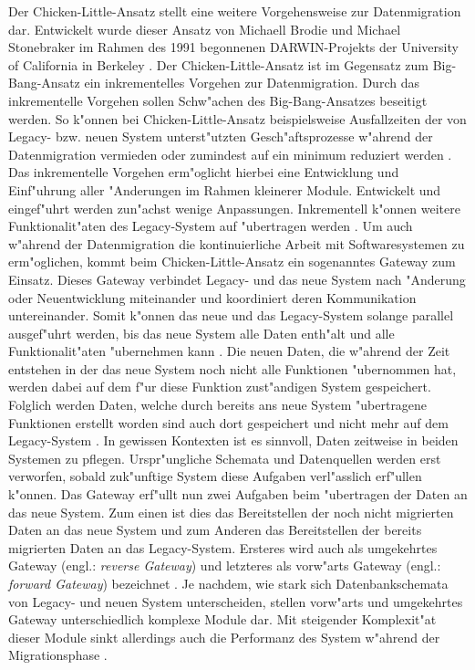 Der Chicken-Little-Ansatz stellt eine weitere Vorgehensweise zur Datenmigration dar. Entwickelt wurde dieser Ansatz von Michaell Brodie und Michael Stonebraker im Rahmen des 1991 begonnenen DARWIN-Projekts der University of California in Berkeley \citep{zoulafy-2002}. Der Chicken-Little-Ansatz ist im Gegensatz zum Big-Bang-Ansatz ein inkrementelles Vorgehen zur Datenmigration. Durch das inkrementelle Vorgehen sollen Schw"achen des Big-Bang-Ansatzes beseitigt werden. So k"onnen bei Chicken-Little-Ansatz beispielsweise Ausfallzeiten der von Legacy- bzw. neuen System unterst"utzten Gesch"aftsprozesse w"ahrend der Datenmigration vermieden oder zumindest auf ein minimum reduziert werden \citep{zoulafy-2002}.
\lb
Das inkrementelle Vorgehen erm"oglicht hierbei eine Entwicklung und Einf"uhrung aller "Anderungen im Rahmen kleinerer Module. Entwickelt und eingef"uhrt werden zun"achst wenige Anpassungen. Inkrementell k"onnen weitere Funktionalit"aten des Legacy-System auf "ubertragen werden \citep[S.~2]{wuLawless-1997}.
\lb
Um auch w"ahrend der Datenmigration die kontinuierliche Arbeit mit Softwaresystemen zu erm"oglichen, kommt beim Chicken-Little-Ansatz ein sogenanntes Gateway zum Einsatz. Dieses Gateway verbindet Legacy- und das neue System nach "Anderung oder Neuentwicklung miteinander und koordiniert deren Kommunikation untereinander. Somit k"onnen das neue und das Legacy-System solange parallel ausgef"uhrt werden, bis das neue System alle Daten enth"alt und alle Funktionalit"aten "ubernehmen kann \citep[S.~2]{wuLawless-1997}. Die neuen Daten, die w"ahrend der Zeit entstehen in der das neue System noch nicht alle Funktionen "ubernommen hat, werden dabei auf dem f"ur diese Funktion zust"andigen System gespeichert. Folglich werden Daten, welche durch bereits ans neue System "ubertragene Funktionen erstellt worden sind auch dort gespeichert und nicht mehr auf dem Legacy-System \citep[S.~2]{wuLawless-1997}. In gewissen Kontexten ist es sinnvoll, Daten zeitweise in beiden Systemen zu pflegen. Urspr"ungliche Schemata und Datenquellen werden erst verworfen, sobald zuk"unftige System diese Aufgaben verl"asslich erf"ullen k"onnen.
\lb
Das Gateway erf"ullt nun zwei Aufgaben beim "ubertragen der Daten an das neue System. Zum einen ist dies das Bereitstellen der noch nicht migrierten Daten an das neue System und zum Anderen das Bereitstellen der bereits migrierten Daten an das Legacy-System. Ersteres wird auch als umgekehrtes Gateway (engl.: \textit{reverse Gateway}) und letzteres als vorw"arts Gateway (engl.: \textit{forward Gateway}) bezeichnet \citep[S.~2]{wuLawless-1997}. Je nachdem, wie stark sich Datenbankschemata von Legacy- und neuen System unterscheiden, stellen vorw"arts und umgekehrtes Gateway unterschiedlich komplexe Module dar. Mit steigender Komplexit"at dieser Module sinkt allerdings auch die Performanz des System w"ahrend der Migrationsphase \citep[S.~109]{bisbal-1999}.
